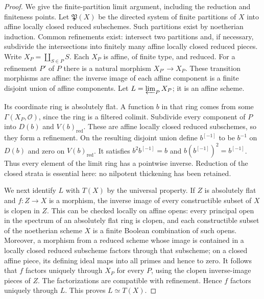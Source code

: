 \begin{proof}
We give the finite-partition limit argument, including the reduction
and finiteness points.  Let $\mathfrak P(X)$ be the directed system of
finite partitions of $X$ into affine locally closed reduced subschemes.
Such partitions exist by noetherian induction.  Common refinements
exist: intersect two partitions and, if necessary, subdivide the
intersections into finitely many affine locally closed reduced pieces.
Write $X_P=\coprod_{S\in P}S$.  Each $X_P$ is affine, of finite type,
and reduced.  For a refinement $P'$ of $P$ there is a natural morphism
$X_{P'}\to X_P$.  These transition morphisms are affine: the inverse
image of each affine component is a finite disjoint union of affine
components.  Let $L=\varprojlim_P X_P$; it is an affine scheme.

Its coordinate ring is absolutely flat.  A function $b$ in that ring
comes from some $\Gamma(X_P,\mathcal O)$, since the ring is a filtered
colimit.  Subdivide every component of $P$ into $D(b)$ and $V(b)_{
\mathrm{red}}$.  These are affine locally closed reduced subschemes,
so they form a refinement.  On the resulting disjoint union define
$b^{[-1]}$ to be $b^{-1}$ on $D(b)$ and zero on $V(b)_{
\mathrm{red}}$.  It satisfies
$b^2b^{[-1]}=b$ and $b(b^{[-1]})^2=b^{[-1]}$.  Thus every element of
the limit ring has a pointwise inverse.  Reduction of the closed
strata is essential here: no nilpotent thickening has been retained.

We next identify $L$ with $T(X)$ by the universal property.  If $Z$ is
absolutely flat and $f:Z\to X$ is a morphism, the inverse image of every
constructible subset of $X$ is clopen in $Z$.  This can be checked
locally on affine opens: every principal open in the spectrum of an
absolutely flat ring is clopen, and each constructible subset of the
noetherian scheme $X$ is a finite Boolean combination of such opens.
Moreover, a morphism from a reduced scheme whose image is contained
in a locally closed reduced subscheme factors through that subscheme;
on a closed affine piece, its defining ideal maps into all primes and
hence to zero.  It follows that $f$ factors uniquely through $X_P$
for every $P$, using the clopen inverse-image pieces of $Z$.  The
factorizations are compatible with refinement.  Hence $f$ factors
uniquely through $L$.  This proves $L\simeq T(X)$.


\end{proof}
